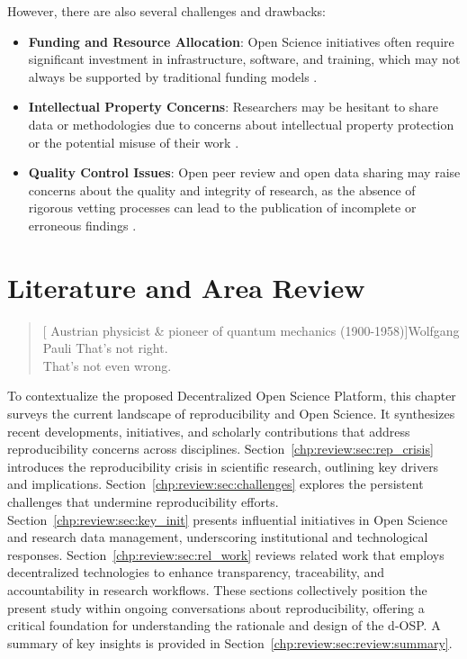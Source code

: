\documentclass[final]{rc-book-2.14}
\begin{document}
However, there are also several challenges and drawbacks:

\begin{itemize}
    \item \textbf{Funding and Resource Allocation}: Open Science initiatives often require significant investment in infrastructure, software, and training, which may not always be supported by traditional funding models \cite{Borgman2012}.
    \item \textbf{Intellectual Property Concerns}: Researchers may be hesitant to share data or methodologies due to concerns about intellectual property protection or the potential misuse of their work \cite{Boulton2015}.
    \item \textbf{Quality Control Issues}: Open peer review and open data sharing may raise concerns about the quality and integrity of research, as the absence of rigorous vetting processes can lead to the publication of incomplete or erroneous findings \cite{Piwowar2011}.
\end{itemize}

\chapter{Literature and Area Review}
\label{chp:review}

\begin{quotation}[ Austrian physicist \& pioneer of quantum mechanics (1900-1958)]{Wolfgang Pauli}
    That's not right. \\  That's not even wrong.
\end{quotation}

\drop To contextualize the proposed Decentralized Open Science Platform, this chapter surveys the current landscape of reproducibility and Open Science. It synthesizes recent developments, initiatives, and scholarly contributions that address reproducibility concerns across disciplines. Section~\ref{chp:review:sec:rep_crisis} introduces the reproducibility crisis in scientific research, outlining key drivers and implications. Section~\ref{chp:review:sec:challenges} explores the persistent challenges that undermine reproducibility efforts. Section~\ref{chp:review:sec:key_init} presents influential initiatives in Open Science and research data management, underscoring institutional and technological responses. Section~\ref{chp:review:sec:rel_work} reviews related work that employs decentralized technologies to enhance transparency, traceability, and accountability in research workflows. These sections collectively position the present study within ongoing conversations about reproducibility, offering a critical foundation for understanding the rationale and design of the d-OSP. A summary of key insights is provided in Section~\ref{chp:review:sec:review:summary}.
\end{document}
